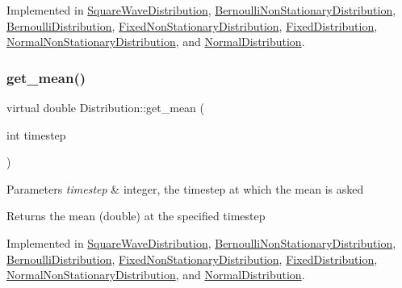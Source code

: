 Implemented in \mbox{\hyperlink{class_square_wave_distribution_a7994182585346203ec158272cc39b17e}{Square\+Wave\+Distribution}}, \mbox{\hyperlink{class_bernoulli_non_stationary_distribution_a4aee952b4eebc5d36ff318b4c30f4a5d}{Bernoulli\+Non\+Stationary\+Distribution}}, \mbox{\hyperlink{class_bernoulli_distribution_ae733579a1c78c01ba8d915bfb8d7b088}{Bernoulli\+Distribution}}, \mbox{\hyperlink{class_fixed_non_stationary_distribution_afd4a118bfe398f700e93430ca05dbae6}{Fixed\+Non\+Stationary\+Distribution}}, \mbox{\hyperlink{class_fixed_distribution_a1babd43b5bbc4e0a720ca77690c9adad}{Fixed\+Distribution}}, \mbox{\hyperlink{class_normal_non_stationary_distribution_a0bd7d418784487c822c330f2b51a6112}{Normal\+Non\+Stationary\+Distribution}}, and \mbox{\hyperlink{class_normal_distribution_abd089ca83f0b358099aba4873a86f091}{Normal\+Distribution}}.

\mbox{\label{class_distribution_ac9c74d18549f532caa09ae86d8b25b55}} 
\subsubsection{\texorpdfstring{get\+\_\+mean()}{get\_mean()}}
{\footnotesize\ttfamily virtual double Distribution\+::get\+\_\+mean (\begin{DoxyParamCaption}\item[{int}]{timestep }\end{DoxyParamCaption})\hspace{0.3cm}{\ttfamily [pure virtual]}}


\begin{DoxyParams}{Parameters}
{\em timestep} & integer, the timestep at which the mean is asked \\
\hline
\end{DoxyParams}
\begin{DoxyReturn}{Returns}
the mean (double) at the specified timestep 
\end{DoxyReturn}


Implemented in \mbox{\hyperlink{class_square_wave_distribution_ac2e790a852c02473e70e4ff5090cfc51}{Square\+Wave\+Distribution}}, \mbox{\hyperlink{class_bernoulli_non_stationary_distribution_ab1cf34057259a933b7957fbff28ed442}{Bernoulli\+Non\+Stationary\+Distribution}}, \mbox{\hyperlink{class_bernoulli_distribution_a7756a9b4861bf90bc7cc346e77b40603}{Bernoulli\+Distribution}}, \mbox{\hyperlink{class_fixed_non_stationary_distribution_aa9ed51fbf731f288a76a3a9e0aee8390}{Fixed\+Non\+Stationary\+Distribution}}, \mbox{\hyperlink{class_fixed_distribution_af9199f9076551694af2397c7dd69096e}{Fixed\+Distribution}}, \mbox{\hyperlink{class_normal_non_stationary_distribution_ae3d2f4fb0e5c9b706c84d05ac14de2aa}{Normal\+Non\+Stationary\+Distribution}}, and \mbox{\hyperlink{class_normal_distribution_ad3165276bf35135409974e73f3cdd6d0}{Normal\+Distribution}}.

